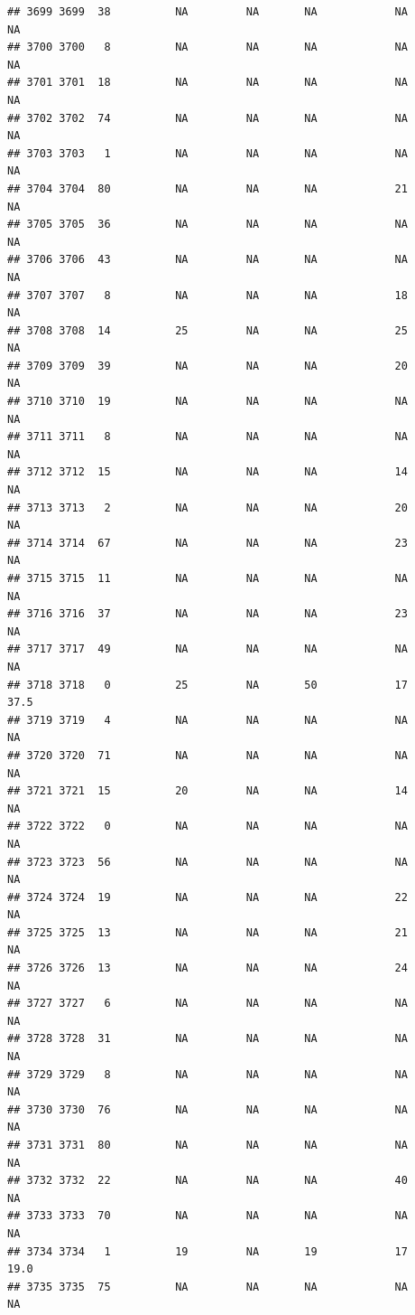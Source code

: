 \documentclass[man]{apa6}
\begin{document}
\begin{verbatim}
## 3699 3699  38          NA         NA       NA            NA       NA
## 3700 3700   8          NA         NA       NA            NA       NA
## 3701 3701  18          NA         NA       NA            NA       NA
## 3702 3702  74          NA         NA       NA            NA       NA
## 3703 3703   1          NA         NA       NA            NA       NA
## 3704 3704  80          NA         NA       NA            21       NA
## 3705 3705  36          NA         NA       NA            NA       NA
## 3706 3706  43          NA         NA       NA            NA       NA
## 3707 3707   8          NA         NA       NA            18       NA
## 3708 3708  14          25         NA       NA            25       NA
## 3709 3709  39          NA         NA       NA            20       NA
## 3710 3710  19          NA         NA       NA            NA       NA
## 3711 3711   8          NA         NA       NA            NA       NA
## 3712 3712  15          NA         NA       NA            14       NA
## 3713 3713   2          NA         NA       NA            20       NA
## 3714 3714  67          NA         NA       NA            23       NA
## 3715 3715  11          NA         NA       NA            NA       NA
## 3716 3716  37          NA         NA       NA            23       NA
## 3717 3717  49          NA         NA       NA            NA       NA
## 3718 3718   0          25         NA       50            17     37.5
## 3719 3719   4          NA         NA       NA            NA       NA
## 3720 3720  71          NA         NA       NA            NA       NA
## 3721 3721  15          20         NA       NA            14       NA
## 3722 3722   0          NA         NA       NA            NA       NA
## 3723 3723  56          NA         NA       NA            NA       NA
## 3724 3724  19          NA         NA       NA            22       NA
## 3725 3725  13          NA         NA       NA            21       NA
## 3726 3726  13          NA         NA       NA            24       NA
## 3727 3727   6          NA         NA       NA            NA       NA
## 3728 3728  31          NA         NA       NA            NA       NA
## 3729 3729   8          NA         NA       NA            NA       NA
## 3730 3730  76          NA         NA       NA            NA       NA
## 3731 3731  80          NA         NA       NA            NA       NA
## 3732 3732  22          NA         NA       NA            40       NA
## 3733 3733  70          NA         NA       NA            NA       NA
## 3734 3734   1          19         NA       19            17     19.0
## 3735 3735  75          NA         NA       NA            NA       NA

\end{verbatim}
\end{document}
